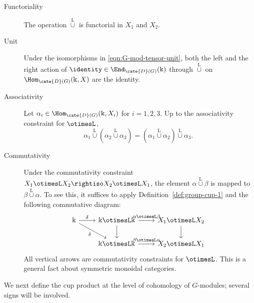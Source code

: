 \begin{description}
	\item[Functoriality] The operation $\overset{\mathrm{L}}{\cup}$ is
	functorial in $X_1$ and $X_2$.
	\item[Unit] Under the isomorphisms in
	\eqref{eqn:G-mod-tensor-unit}, both the left and the right action of
	$\identity\in\End_{\cate{D}(G)}(\Bbbk)$ through
	$\overset{\mathrm{L}}{\cup}$ on $\Hom_{\cate{D}(G)}(\Bbbk,X)$ are the
	identity.
	\item[Associativity] Let
	$\alpha_i\in\Hom_{\cate{D}(G)}(\Bbbk,X_i)$ for $i=1,2,3$. Up to the
	associativity constraint for $\otimesL$,
	\[ \alpha_1 \overset{\mathrm{L}}{\cup} (\alpha_2 \overset{\mathrm{L}}{\cup} \alpha_3) = (\alpha_1 \overset{\mathrm{L}}{\cup} \alpha_2) \overset{\mathrm{L}}{\cup} \alpha_3 . \]
	\item[Commutativity] Under the commutativity constraint
	$X_1\otimesL X_2\rightiso X_2\otimesL X_1$, the element
	$\alpha\overset{\mathrm{L}}{\cup}\beta$ is mapped to
	$\beta\overset{\mathrm{L}}{\cup}\alpha$. To see this, it suffices to
	apply Definition~\ref{def:group-cup-1} and the following commutative
	diagram:
	\[\begin{tikzcd}
		\Bbbk \arrow[r, "\delta"] \arrow[rd, "\delta"'] & \Bbbk \otimesL \Bbbk \arrow[d] \arrow[r, "{\alpha \otimesL \beta}"] & X_1 \otimesL X_2 \arrow[d] \\
		& \Bbbk \otimesL \Bbbk \arrow[r, "{\beta \otimesL \alpha}"] & X_2 \otimesL X_1
	\end{tikzcd}\]
	All vertical arrows are commutativity constraints for $\otimesL$. This is
	a general fact about symmetric monoidal categories.
\end{description}

We next define the cup product at the level of cohomology of $G$-modules;
several signs will be involved.

